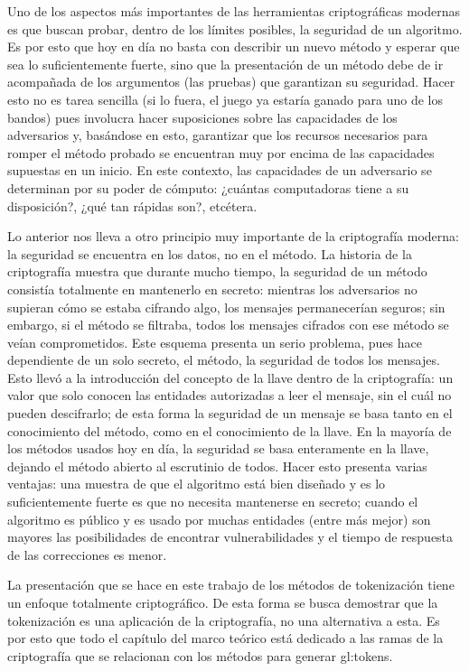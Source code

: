 Uno de los aspectos más importantes de las herramientas criptográficas
modernas es que buscan probar, dentro de los límites posibles, la
seguridad de un algoritmo. Es por esto que hoy en día no basta con
describir un nuevo método y esperar que sea lo suficientemente fuerte,
sino que la presentación de un método debe de ir acompañada de los
argumentos (las pruebas) que garantizan su seguridad. Hacer esto no es
tarea sencilla (si lo fuera, el juego ya estaría ganado para uno de los
bandos) pues involucra hacer suposiciones sobre las capacidades de
los adversarios y, basándose en esto, garantizar que los recursos necesarios
para romper el método probado se encuentran muy por encima de las capacidades
supuestas en un inicio. En este contexto, las capacidades de un adversario
se determinan por su poder de cómputo: ¿cuántas computadoras tiene a su
disposición?, ¿qué tan rápidas son?, etcétera.

Lo anterior nos lleva a otro principio muy importante de la criptografía
moderna: la seguridad se encuentra en los datos, no en el método. La historia
de la criptografía muestra que durante mucho tiempo, la seguridad de un método
consistía totalmente en mantenerlo en secreto: mientras los adversarios
no supieran cómo se estaba cifrando algo, los mensajes permanecerían seguros;
sin embargo, si el método se filtraba, todos los mensajes cifrados con ese
método se veían comprometidos. Este esquema presenta un serio problema,
pues hace dependiente de un solo secreto, el método, la seguridad de todos
los mensajes. Esto llevó a la introducción del concepto de la llave dentro
de la criptografía: un valor que solo conocen las entidades autorizadas a leer
el mensaje, sin el cuál no pueden descifrarlo; de esta forma la seguridad de un
mensaje se basa tanto en el conocimiento del método, como en el conocimiento
de la llave. En la mayoría de los métodos usados hoy en día, la seguridad se
basa enteramente en la llave, dejando el método abierto al escrutinio de todos.
Hacer esto presenta varias ventajas: una muestra de que el algoritmo está
bien diseñado y es lo suficientemente fuerte es que no necesita mantenerse en
secreto; cuando el algoritmo es público y es usado por muchas entidades (entre
más mejor) son mayores las posibilidades de encontrar vulnerabilidades y
el tiempo de respuesta de las correcciones es menor.

La presentación que se hace en este trabajo de los métodos de tokenización
tiene un enfoque totalmente criptográfico. De esta forma se busca demostrar
que la tokenización es una aplicación de la criptografía, no una alternativa
a esta. Es por esto que todo el capítulo del marco teórico está dedicado a las
ramas de la criptografía que se relacionan con los métodos para generar
\glspl{gl:token}.


